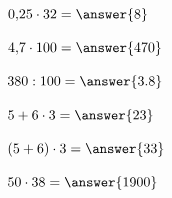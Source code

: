\documentclass{ximera}
\begin{document}
\begin{oefening}[Rekenroutine A]{\oefB\ESS}
\begin{question} \(0{,}25\cdot32=\answer{8}\) \end{question}

\begin{question} \(4{,}7\cdot100=\answer{470}\) \end{question}

\begin{question} \(380:100=\answer{3.8}\) \end{question}

\begin{question} \(5+6\cdot3=\answer{23}\) \end{question}

\begin{question} \((5+6)\cdot3=\answer{33}\) \end{question}

\begin{question} \(50\cdot38=\answer{1900}\) \end{question}

\end{oefening}
\end{document}
